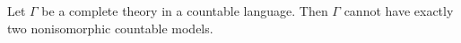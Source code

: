 Let $\Gamma$ be a complete theory in a countable language. Then $\Gamma$ cannot have exactly two nonisomorphic countable models.
